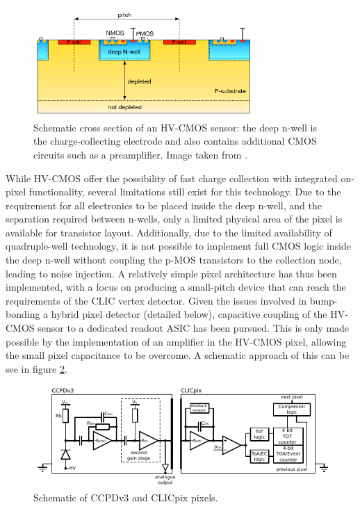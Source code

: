 \begin{figure}
\centering
\includegraphics[width=0.75\textwidth]{CLICdpVertex/Plots/HV-CMOSDiagram.png}
\caption[Schematic cross section of an HV-CMOS sensor: the deep n-well is the charge-collecting electrode and also contains additional CMOS circuits such as a preamplifier.  Image taken from \cite{Benoit:2016vup}.]{Schematic cross section of an HV-CMOS sensor: the deep n-well is the charge-collecting electrode and also contains additional CMOS circuits such as a preamplifier.  Image taken from \cite{Benoit:2016vup}.}
\label{fig:hvcmos}
\end{figure}

While HV-CMOS offer the possibility of fast charge collection with integrated on-pixel functionality, several limitations still exist for this technology. Due to the requirement for all electronics to be placed inside the deep n-well, and the separation required between n-wells, only a limited physical area of the pixel is available for transistor layout. Additionally, due to the limited availability of quadruple-well technology, it is not possible to implement full CMOS logic inside the deep n-well without coupling the p-MOS transistors to the collection node, leading to noise injection. A relatively simple pixel architecture has thus been implemented, with a focus on producing a small-pitch device that can reach the requirements of the CLIC vertex detector. Given the issues involved in bump-bonding a hybrid pixel detector (detailed below), capacitive coupling of the HV-CMOS sensor to a dedicated readout ASIC has been pursued. This is only made possible by the implementation of an amplifier in the HV-CMOS pixel, allowing the small pixel capacitance to be overcome. A schematic approach of this can be see in figure \ref{fig:ccpdandclicpix}.
 
\begin{figure}
\centering
\includegraphics[width=1.0\textwidth]{CLICdpVertex/Plots/schematic.pdf}
\caption[Schematic of CCPDv3 and CLICpix pixels.]{Schematic of CCPDv3 and CLICpix pixels.}
\label{fig:ccpdandclicpix}
\end{figure}

